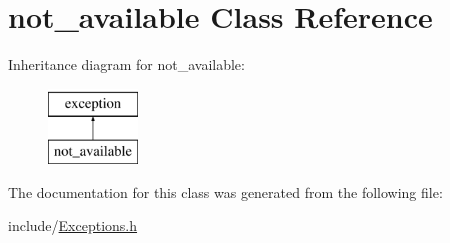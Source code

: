 \hypertarget{classnot__available}{}\section{not\+\_\+available Class Reference}
\label{classnot__available}
Inheritance diagram for not\+\_\+available\+:\begin{figure}[H]
\begin{center}
\leavevmode
\includegraphics[height=2.000000cm]{classnot__available}
\end{center}
\end{figure}


The documentation for this class was generated from the following file\+:\begin{DoxyCompactItemize}
\item 
include/\hyperlink{_exceptions_8h}{Exceptions.\+h}\end{DoxyCompactItemize}
